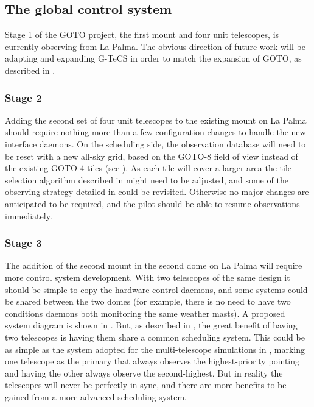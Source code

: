 \subsection{The global control system}
\label{sec:gtecs_future}
\begin{colsection}

Stage 1 of the GOTO project, the first mount and four unit telescopes, is currently observing from La Palma. The obvious direction of future work will be adapting and expanding G-TeCS in order to match the expansion of GOTO, as described in .

\subsubsection{Stage 2}

Adding the second set of four unit telescopes to the existing mount on La Palma should require nothing more than a few configuration changes to handle the new interface daemons. On the scheduling side, the observation database will need to be reset with a new all-sky grid, based on the GOTO-8 field of view instead of the existing GOTO-4 tiles (see ). As each tile will cover a larger area the tile selection algorithm described in  might need to be adjusted, and some of the observing strategy detailed in  could be revisited. Otherwise no major changes are anticipated to be required, and the pilot should be able to resume observations immediately.

\subsubsection{Stage 3}

The addition of the second mount in the second dome on La Palma will require more control system development. With two telescopes of the same design it should be simple to copy the hardware control daemons, and some systems could be shared between the two domes (for example, there is no need to have two conditions daemons both monitoring the same weather masts). A proposed system diagram is shown in . But, as described in , the great benefit of having two telescopes is having them share a common scheduling system. This could be as simple as the system adopted for the multi-telescope simulations in , marking one telescope as the primary that always observes the highest-priority pointing and having the other always observe the second-highest. But in reality the telescopes will never be perfectly in sync, and there are more benefits to be gained from a more advanced scheduling system.


\end{colsection}
